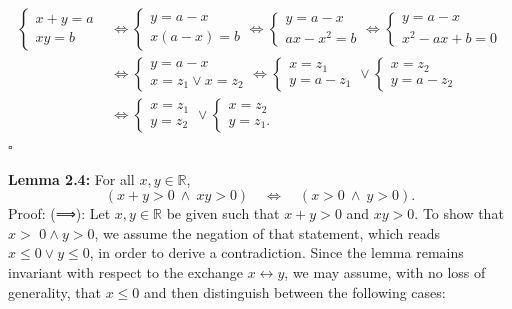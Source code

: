 \documentclass[11pt,letterpaper]{article}
\begin{document}
\[
\begin{aligned}
\left\{\begin{array}{l}
x+y=a \\
x y=b
\end{array}\right. & \Longleftrightarrow\left\{\begin{array} { l } 
{ y = a - x } \\
{ x ( a - x ) = b }
\end{array} \Longleftrightarrow \left\{\begin{array} { l } 
{ y = a - x } \\
{ a x - x ^ { 2 } = b }
\end{array} \Longleftrightarrow \left\{\begin{array}{l}
y=a-x \\
x^{2}-a x+b=0
\end{array}\right.\right.\right. \\
& \Longleftrightarrow\left\{\begin{array} { l } 
{ y = a - x } \\
{ x = z _ { 1 } \vee x = z _ { 2 } }
\end{array} \Longleftrightarrow \left\{\begin{array} { l } 
{ x = z _ { 1 } } \\
{ y = a - z _ { 1 } }
\end{array} \vee \left\{\begin{array}{l}
x=z_{2} \\
y=a-z_{2}
\end{array}\right.\right.\right. \\
& \Longleftrightarrow\left\{\begin{array} { l } 
{ x = z _ { 1 } } \\
{ y = z _ { 2 } }
\end{array} \vee \left\{\begin{array}{l}
x=z_{2} \\
y=z_{1} .
\end{array}\right.\right.
\end{aligned}
\] \(\square\)

\noindent\textbf{Lemma 2.4:} For all $x,y\in\mathbb R$,
\[
 (x+y>0\ \wedge\ xy>0)\quad\Longleftrightarrow\quad(x>0\ \wedge\ y>0).
\]
Proof: (⟹): Let $x, y \in \mathbb{R}$ be given such that $x+y>0$ and $x y>0$. To show that $x>$ $0 \wedge y>0$, we assume the negation of that statement, which reads $x \leq 0 \vee y \leq 0$, in order to derive a contradiction. Since the lemma remains invariant with respect to the exchange $x \leftrightarrow y$, we may assume, with no loss of generality, that $x \leq 0$ and then distinguish between the following cases:
\end{document}
